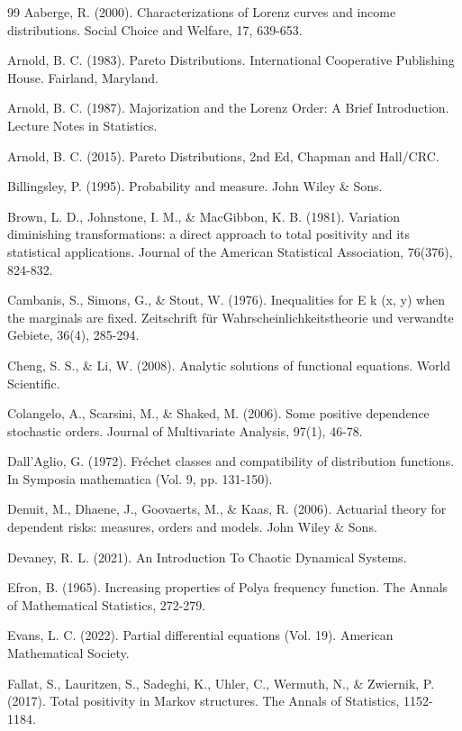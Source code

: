 \documentclass[onecolumn]{article}
\begin{document}
\begin{thebibliography}{99}
\bibitem{[14]} Aaberge, R. (2000). Characterizations of Lorenz curves and
income distributions. Social Choice and Welfare, 17, 639-653.

\bibitem{[4]} Arnold, B. C. (1983). Pareto Distributions. International
Cooperative Publishing House. Fairland, Maryland.

\bibitem{[1]} Arnold, B. C. (1987). Majorization and the Lorenz Order: A
Brief Introduction. Lecture Notes in Statistics.

\bibitem{[2]} Arnold, B. C. (2015). Pareto Distributions, 2nd Ed, Chapman
and Hall/CRC.

\bibitem{[68]} Billingsley, P. (1995). Probability and measure. John Wiley
\& Sons.

\bibitem{[64]} Brown, L. D., Johnstone, I. M., \& MacGibbon, K. B. (1981).
Variation diminishing transformations: a direct approach to total positivity
and its statistical applications. Journal of the American Statistical
Association, 76(376), 824-832.

\bibitem{[35]} Cambanis, S., Simons, G., \& Stout, W. (1976). Inequalities
for E k (x, y) when the marginals are fixed. Zeitschrift f\"{u}r
Wahrscheinlichkeitstheorie und verwandte Gebiete, 36(4), 285-294.

\bibitem{[44]} Cheng, S. S., \& Li, W. (2008). Analytic solutions of
functional equations. World Scientific.

\bibitem{[29]} Colangelo, A., Scarsini, M., \& Shaked, M. (2006). Some
positive dependence stochastic orders. Journal of Multivariate Analysis,
97(1), 46-78.

\bibitem{[76]} Dall'Aglio, G. (1972). Fr\'{e}chet classes and compatibility
of distribution functions. In Symposia mathematica (Vol. 9, pp. 131-150).

\bibitem{[33]} Denuit, M., Dhaene, J., Goovaerts, M., \& Kaas, R. (2006).
Actuarial theory for dependent risks: measures, orders and models. John
Wiley \& Sons.

\bibitem{[18]} Devaney, R. L. (2021). An Introduction To Chaotic Dynamical
Systems.

\bibitem{[60]} Efron, B. (1965). Increasing properties of Polya frequency
function. The Annals of Mathematical Statistics, 272-279.

\bibitem{[20]} Evans, L. C. (2022). Partial differential equations (Vol.
19). American Mathematical Society.

\bibitem{[63]} Fallat, S., Lauritzen, S., Sadeghi, K., Uhler, C., Wermuth,
N., \& Zwiernik, P. (2017). Total positivity in Markov structures. The
Annals of Statistics, 1152-1184.


\end{thebibliography}
\end{document}
